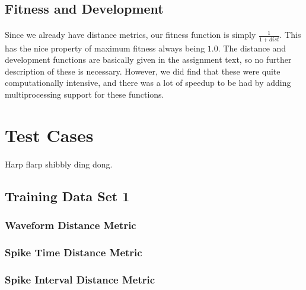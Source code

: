 \documentclass[a4paper,12pt]{article}
\begin{document}
\subsection{Fitness and Development}

\paragraph{}Since we already have distance metrics, our fitness function is simply $\frac{1}{1+dist}$. This has the nice property of maximum fitness always being $1.0$. The distance and development functions are basically given in the assignment text, so no further description of these is necessary. However, we did find that these were quite computationally intensive, and there was a lot of speedup to be had by adding multiprocessing support for these functions.

\section{Test Cases}

\paragraph{}Harp flarp shibbly ding dong.

\subsection{Training Data Set 1}
\subsubsection{Waveform Distance Metric}

\subsubsection{Spike Time Distance Metric}

\subsubsection{Spike Interval Distance Metric}
\end{document}

